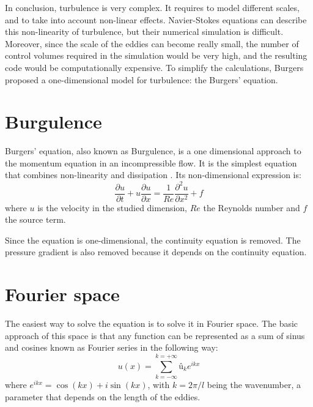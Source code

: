 In conclusion, turbulence is very complex. It requires to model different scales, and to take into account non-linear effects. Navier-Stokes equations can describe this non-linearity of turbulence, but their numerical simulation is difficult. Moreover, since the scale of the eddies can become really small, the number of control volumes required in the simulation would be very high, and the resulting code would be computationally expensive. To simplify the calculations, Burgers proposed a one-dimensional model for turbulence: the Burgers' equation.

\section{Burgulence}
Burgers' equation, also known as Burgulence, is a one dimensional approach to the momentum equation in an incompressible flow. It is the simplest equation that combines non-linearity and dissipation \cite{Johnson2016}. Its non-dimensional expression is:
\begin{equation}
\frac{\partial u}{\partial t}+u\frac{\partial u}{\partial x}=\frac{1}{Re}\frac{\partial^{2}u}{\partial x^{2}}+f
\end{equation}
where $u$ is the velocity in the studied dimension, $Re$ the Reynolds number and $f$ the source term.

Since the equation is one-dimensional, the continuity equation is removed. The pressure gradient is also removed because it depends on the continuity equation.

\section{Fourier space}
The easiest way to solve the equation is to solve it in Fourier space. The basic approach of this space is that any function can be represented as a sum of sinus and cosines known as Fourier series in the following way:
\begin{equation}
u\left(x\right)=\sum_{k=-\infty}^{k=+\infty}û_{k}e^{ikx}
\end{equation}
where $e^{ikx}=\cos\left(kx\right)+i\sin\left(kx\right)$, with $k=2\pi/l$ being the wavenumber, a parameter that depends on the length of the eddies.

